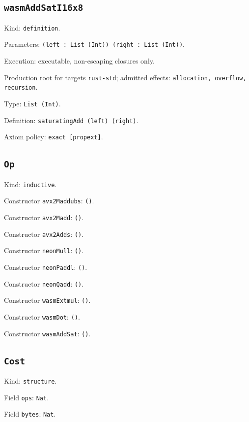 \documentclass[11pt]{article}
\begin{document}
\subsection*{\texttt{wasmAddSatI16x8}}
\noindent Kind: \texttt{definition}.\par
\noindent Parameters: \texttt{(left : List (Int)) (right : List (Int))}.\par
\noindent Execution: executable, non-escaping closures only.\par
\noindent Production root for targets \texttt{rust-std}; admitted effects: \texttt{allocation, overflow, recursion}.\par
\noindent Type: \texttt{List (Int)}.\par
\noindent Definition: \texttt{saturatingAdd (left) (right)}.\par
\noindent Axiom policy: \texttt{exact [propext]}.\par
\subsection*{\texttt{Op}}
\noindent Kind: \texttt{inductive}.\par
\noindent Constructor \texttt{avx2Maddubs}: \texttt{()}.\par
\noindent Constructor \texttt{avx2Madd}: \texttt{()}.\par
\noindent Constructor \texttt{avx2Adds}: \texttt{()}.\par
\noindent Constructor \texttt{neonMull}: \texttt{()}.\par
\noindent Constructor \texttt{neonPaddl}: \texttt{()}.\par
\noindent Constructor \texttt{neonQadd}: \texttt{()}.\par
\noindent Constructor \texttt{wasmExtmul}: \texttt{()}.\par
\noindent Constructor \texttt{wasmDot}: \texttt{()}.\par
\noindent Constructor \texttt{wasmAddSat}: \texttt{()}.\par
\subsection*{\texttt{Cost}}
\noindent Kind: \texttt{structure}.\par
\noindent Field \texttt{ops}: \texttt{Nat}.\par
\noindent Field \texttt{bytes}: \texttt{Nat}.\par
\end{document}
